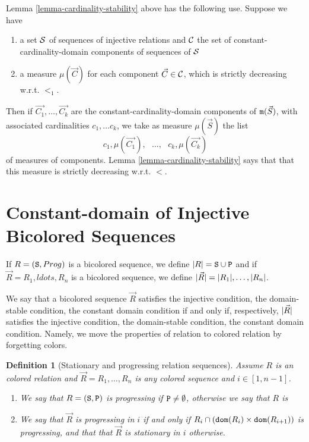 \documentclass{lmcs}
\newtheorem{definition}[theorem]{Definition}
\begin{document}
Lemma \ref{lemma-cardinality-stability} above has the following use. Suppose we have
\begin{enumerate}
\item
a set ${\mathcal S}$ of sequences of injective relations and ${\mathcal C}$ the set of  
constant-cardinality-domain components of sequences of ${\mathcal S}$
\item 
a measure $\mu(\vec{C})$ for each component $\vec{C} \in {\mathcal C}$, which is 
strictly decreasing w.r.t. $<_1$. 
\end{enumerate}

Then if $\vec{C_1}, \ldots,\vec{C_k}$ are the constant-cardinality-domain components of 
${\tt m}(\vec{S})$, with associated cardinalities $c_1, \ldots c_k$,
we take as measure $\mu(\vec{S})$ the list 
$$
c_1,\mu(\vec{C_1}), \ \ \ \ldots, \ \ \ c_k, \mu(\vec{C_k})
$$ 
of measures of components. Lemma \ref{lemma-cardinality-stability} says that that this 
measure is strictly decreasing w.r.t. $<$.


\newpage   \section{Constant-domain of Injective Bicolored Sequences}

If $R= ({\tt S},Prog)$ is a bicolored sequence, we define ${| R |} = {\tt S} \cup {\tt P}$
and if $\vec{R}=R_1, ldots, R_n$ is a bicolored sequence, we define
 ${| \vec{R} |} = {| R_1 |}, \ldots, {| R_n |}$.

We say that  a bicolored sequence $\vec{R}$ satisfies the injective condition, the domain-stable
condition, the constant domain condition if and only if, respectively, ${| \vec{R} |}$
satisfies the injective condition, the domain-stable
condition, the constant domain condition. Namely, we move the properties of relation to 
colored relation by forgetting colors.

\begin{definition}[Stationary and progressing relation sequences]
Assume $R$ is an colored relation and $\vec{R}=R_1, \ldots, R_n$ is any colored sequence 
and $i \in [1,n-1]$.
\begin{enumerate}

\item
We say that $R=({\tt S},{\tt P})$ is progressing if ${\tt P} \not = \emptyset$, otherwise we say
that $R$ is 

\item
We say that $\vec{R}$ is progressing in $i$ if and only if 
$R_i \cap ({\tt dom}(R_i) \times {\tt dom}(R_{i+1}))$ is progressing,
and that that $\vec{R}$ is stationary in $i$ otherwise.
\end{enumerate}
\end{definition}
\end{document}
